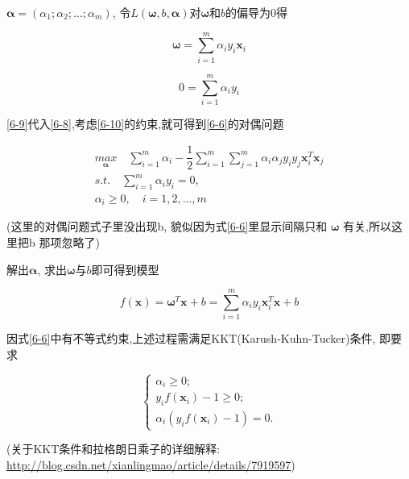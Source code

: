 \documentclass[12pt]{article}
\numberwithin{equation}{section}%
\begin{document}
$\boldsymbol{\alpha}=(\alpha_{1};\alpha_{2};\ldots;\alpha_{m})$, 令$L(\boldsymbol{\omega},b,\boldsymbol{\alpha})$对$\boldsymbol{\omega}$和$b$的偏导为0得

\begin{equation}
\boldsymbol{\omega}=\sum_{i=1}^{m}\alpha_{i}y_{i}\boldsymbol{x}_{i}
\label{6-9}
\end{equation}

\begin{equation}
0=\sum_{i=1}^{m}\alpha_{i}y_{i}
\label{6-10}
\end{equation}

\ref{6-9}代入\ref{6-8},考虑\ref{6-10}的约束,就可得到\ref{6-6}的对偶问题

\begin{equation}
\begin{split} 
{\underset{\boldsymbol{\alpha}}{max}} \quad  \sum_{i=1}^{m}\alpha_{i}-\dfrac{1}{2}\sum_{i=1}^{m}\sum_{j=1}^{m}\alpha_{i}\alpha_{j}y_{i}y_{j}{\boldsymbol{x}}_{i}^{T}{\boldsymbol{x}}_{j}  \\
s.t. \quad \sum_{i=1}^{m}\alpha_{i}y_{i} = 0,  \\
\alpha_{i} \geqslant 0, \quad i=1,2, \ldots, m 
\end{split}
\label{6-11}
\end{equation}

(这里的对偶问题式子里没出现b, 貌似因为式\ref{6-6}里显示间隔只和 $\boldsymbol{\omega}$ 有关,所以这里把b 那项忽略了)

解出$\boldsymbol{\alpha}$, 求出$\boldsymbol{\omega}$与$b$即可得到模型

\begin{equation}
f(\boldsymbol{x})=\boldsymbol{\omega}^{T}\boldsymbol{x}+b=\sum_{i=1}^{m}\alpha_{i}y_{i}{\boldsymbol{x}}_{i}^{T}{\boldsymbol{x}}+b
\label{6-12}
\end{equation}

因式\ref{6-6}中有不等式约束,上述过程需满足KKT(Karush-Kuhn-Tucker)条件, 即要求

\begin{equation}
 \left\{ \begin{array}{ll}
\alpha_{i} \geqslant 0;\\
 y_{i}f(\boldsymbol{x}_{i})-1\geqslant 0; \\
 \alpha_{i}(y_{i}f(\boldsymbol{x}_{i})-1) = 0.
\end{array} \right.
\end{equation}

(关于KKT条件和拉格朗日乘子的详细解释: \url{http://blog.csdn.net/xianlingmao/article/details/7919597})
\end{document}
